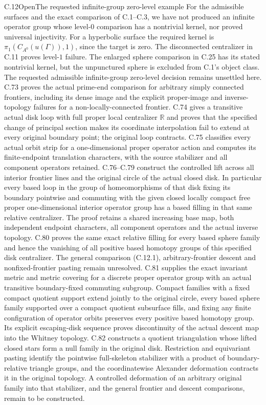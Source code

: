 \begin{claim}{C.12}{Open}{The requested infinite-group zero-level example}
For the admissible surfaces and the exact comparison of C.1--C.3,
we have not produced an infinite operator group whose level-$0$
comparison has a nontrivial kernel, nor proved universal injectivity.
For a hyperbolic surface the required kernel is
$\pi_1(C_{A^0}(u(\Gamma)),1)$, since the target is zero.
The disconnected centralizer in C.11 proves level-$1$ failure.
The enlarged sphere comparison in C.25 has its stated nontrivial
kernel, but the unpunctured sphere is excluded from C.1's object class.
The requested admissible infinite-group zero-level decision remains
unsettled here.
C.73 proves the actual prime-end comparison for arbitrary simply connected frontiers, including its dense image and the explicit proper-image and inverse-topology failures for a non-locally-connected frontier. C.74 gives a transitive actual disk loop with full proper local centralizer $\mathbb R$ and proves that the specified change of principal section makes its coordinate interpolation fail to extend at every original boundary point; the original loop contracts. C.75 classifies every actual orbit strip for a one-dimensional proper operator action and computes its finite-endpoint translation characters, with the source stabilizer and all component operators retained. C.76--C.79 construct the controlled lift across all interior frontier lines and the original circle of the actual closed disk. In particular every based loop in the group of homeomorphisms of that disk fixing its boundary pointwise and commuting with the given closed locally compact free proper one-dimensional interior operator group has a based filling in that same relative centralizer. The proof retains a shared increasing base map, both independent endpoint characters, all component operators and the actual inverse topology. C.80 proves the same exact relative filling for every based sphere family and hence the vanishing of all positive based homotopy groups of this specified disk centralizer. The general comparison (C.12.1), arbitrary-frontier descent and nonfixed-frontier pasting remain unresolved.
C.81 supplies the exact invariant metric and metric covering for a discrete proper operator group with an actual transitive boundary-fixed commuting subgroup. Compact families with a fixed compact quotient support extend jointly to the original circle, every based sphere family supported over a compact quotient subsurface fills, and fixing any finite configuration of operator orbits preserves every positive based homotopy group. Its explicit escaping-disk sequence proves discontinuity of the actual descent map into the Whitney topology. C.82 constructs a quotient triangulation whose lifted closed stars form a null family in the original disk. Restriction and equivariant pasting identify the pointwise full-skeleton stabilizer with a product of boundary-relative triangle groups, and the coordinatewise Alexander deformation contracts it in the original topology. A controlled deformation of an arbitrary original family into that stabilizer, and the general frontier and descent comparisons, remain to be constructed.

\end{claim}
